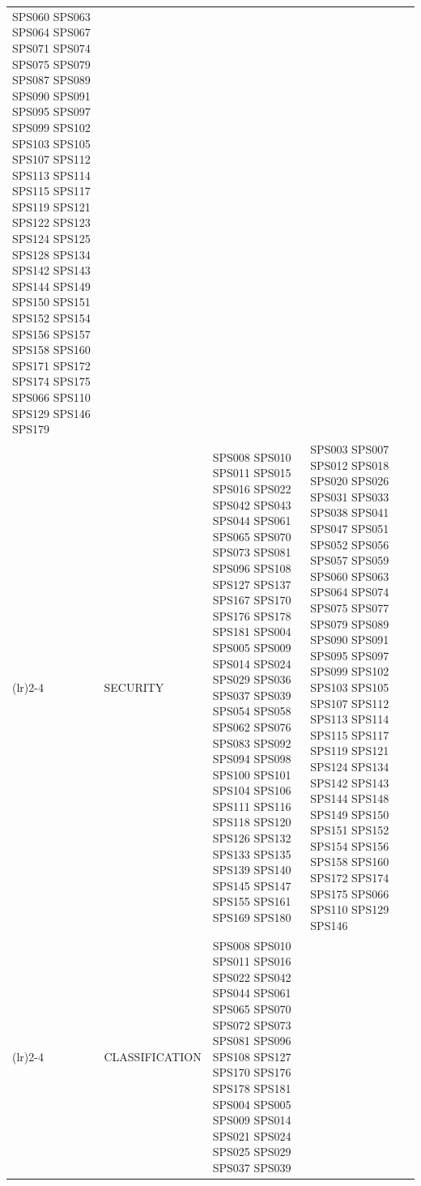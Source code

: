 \begin{table}[htbp]
\begin{tabularx}{\textwidth}{p{0.8cm}p{2.5cm}>{\raggedright\arraybackslash}X>{\raggedright\arraybackslash}X>{\raggedright\arraybackslash}X}
																														  SPS060 SPS063 SPS064 SPS067 SPS071 SPS074 
																														  SPS075 SPS079 SPS087 SPS089 SPS090 SPS091 
																														  SPS095 SPS097 SPS099 SPS102 SPS103 SPS105 
																														  SPS107 SPS112 SPS113 SPS114 SPS115 SPS117 
																														  SPS119 SPS121 SPS122 SPS123 SPS124 SPS125 
																														  SPS128 SPS134 SPS142 SPS143 SPS144 SPS149 
																														  SPS150 SPS151 SPS152 SPS154 SPS156 SPS157 
																														  SPS158 SPS160 SPS171 SPS172 SPS174 SPS175	
																														  SPS066 SPS110 SPS129 SPS146 SPS179                   											\\
		\addlinespace[0.3em]
		\cmidrule(lr){2-4}
											 & SECURITY         	   & SPS008 SPS010 SPS011 SPS015 SPS016 SPS022 
																		 SPS042 SPS043 SPS044 SPS061 SPS065 SPS070 
																		 SPS073 SPS081 SPS096 SPS108 SPS127 SPS137 
																		 SPS167 SPS170 SPS176 SPS178 SPS181 SPS004 
																		 SPS005 SPS009 SPS014 SPS024 SPS029 SPS036 
																		 SPS037 SPS039 SPS054 SPS058 SPS062 SPS076 
																		 SPS083 SPS092 SPS094 SPS098 SPS100 SPS101 
																		 SPS104 SPS106 SPS111 SPS116 SPS118 SPS120 
																		 SPS126 SPS132 SPS133 SPS135 SPS139 SPS140 
																		 SPS145 SPS147 SPS155 SPS161 SPS169 SPS180    & SPS003 SPS007 SPS012 SPS018 SPS020 SPS026 
																													   	SPS031 SPS033 SPS038 SPS041 SPS047 SPS051 
																														SPS052 SPS056 SPS057 SPS059 SPS060 SPS063 
																														SPS064 SPS074 SPS075 SPS077 SPS079 SPS089 
																														SPS090 SPS091 SPS095 SPS097 SPS099 SPS102 
																														SPS103 SPS105 SPS107 SPS112 SPS113 SPS114 
																														SPS115 SPS117 SPS119 SPS121 SPS124 SPS134 
																														SPS142 SPS143 SPS144 SPS148 SPS149 SPS150 
																														SPS151 SPS152 SPS154 SPS156 SPS158 SPS160 
																														SPS172 SPS174 SPS175 SPS066 SPS110 SPS129 
																														SPS146                   											\\
		\addlinespace[0.3em]
		\cmidrule(lr){2-4}
											 & CLASSIFICATION          & SPS008 SPS010 SPS011 SPS016 SPS022 SPS042 
																		 SPS044 SPS061 SPS065 SPS070 SPS072 SPS073 
																		 SPS081 SPS096 SPS108 SPS127 SPS170 SPS176 
																		 SPS178 SPS181 SPS004 SPS005 SPS009 SPS014 
																		 SPS021 SPS024 SPS025 SPS029 SPS037 SPS039 

\end{tabularx}
\end{table}
